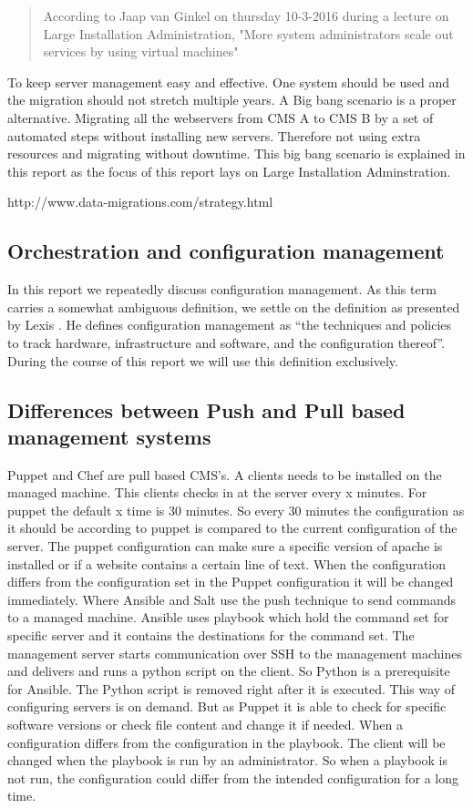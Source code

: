 \begin{quote}
According to Jaap van Ginkel on thursday 10-3-2016 during a lecture on Large Installation Administration, "More system administrators scale out services by using virtual machines"
\end{quote}

To keep server management easy and effective. One system should be used and the migration should not stretch multiple years. A Big bang scenario is a proper alternative. Migrating all the webservers from CMS A to CMS B by a set of automated steps without installing new servers. Therefore not using extra resources and migrating without downtime. This big bang scenario is explained in this report as the focus of this report lays on Large Installation Adminstration.

http://www.data-migrations.com/strategy.html


\subsection{Orchestration and configuration management}\label{subsec:orchestration}
In this report we repeatedly discuss configuration management. As this term carries a somewhat ambiguous definition, we settle on the definition as presented by Lexis \cite{}. He defines configuration management as ``the techniques and policies to track hardware, infrastructure and software, and the configuration thereof''. During the course of this report we will use this definition exclusively.


\subsection{Differences between Push and Pull based management systems}\label{subsec:pushpull}
Puppet and Chef are pull based CMS's. A clients needs to be installed on the managed machine. This clients checks in at the server every x minutes. For puppet the default x time is 30 minutes. So every 30 minutes the configuration as it should be according to puppet is compared to the current configuration of the server. The puppet configuration can make sure a specific version of apache is installed or if a website contains a certain line of text. When the configuration differs from the configuration set in the Puppet configuration it will be changed immediately. Where Ansible and Salt use the push technique to send commands to a managed machine. Ansible uses playbook which hold the command set for specific server and it contains the destinations for the command set. The management server starts communication over SSH to the management machines and delivers and runs a python script on the client. So Python is a prerequisite for Ansible. The Python script is removed right after it is executed. This way of configuring servers is on demand. But as Puppet it is able to check for specific software versions or check file content and change it if needed. When a configuration differs from the configuration in the playbook. The client will be changed when the playbook is run by an administrator. So when a playbook is not run, the configuration could differ from the intended configuration for a long time. 

